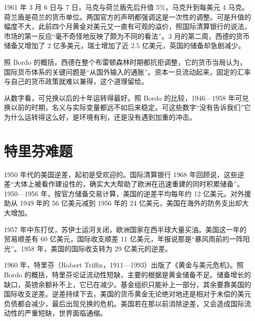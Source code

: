1961 年 3 月 6 日与 7 日，马克与荷兰盾先后升值 5\%，马克升到每美元 4 马克\cite{bis36}。荷兰盾是荷兰的货币单位。两国官方的声明都强调这是一次性的调整。可是升值的幅度不大，此前四个月黄金对美元又一直有可观的溢价，照国际清算银行的说法，市场的第一反应“毫不奇怪地反映了颇为不同的看法”\cite{bis36}。3 月的第二周，西德的货币储备又增加了 2 亿多美元，瑞士增加了近 2.5 亿美元，英国的储备却急剧减少\cite{bis36}。

照 Bordo 的概括，西德在整个布雷顿森林时期都抗拒调整，它的货币当局认为，国际货币体系的关键问题是“从国外输入的通胀”\cite{bordo1993}。资本一旦流动起来，固定的汇率与自己的货币政策就难以兼得，这个道理留给。

从数字看，可兑换以后的十年运转得最好。照 Bordo 的比较，1946—1958 年可兑换以前的时期，名义与实际变量都远不如后来稳定\cite{bordo1993}。可这些数字“没有告诉我们”它为什么运转得这么好，是环境有利，还是没有遇到加重的冲击\cite{bordo1993}。

\section{特里芬难题}\label{sec:brettonwoods-triffin}

1950 年代的美国逆差，起初是受欢迎的。国际清算银行 1968 年回顾说，这些逆差“大体上被看作建设性的，确实大大帮助了欧洲在迅速重建的同时积累储备”\cite{bis36}。1950—1956 年，按官方储备交易计算，美国的逆差平均每年约 12 亿美元\cite{bis36}。对外援助从 1949 年的 56 亿美元减到 1956 年的 24 亿美元，美国在海外的防务支出却大大增加\cite{bis36}。

1957 年中东打仗，苏伊士运河关闭，欧洲国家在西半球大量买油\cite{bis36}。美国这一年的贸易顺差有 60 亿美元，国际收支顺差 11 亿美元，年报说那是“暴风雨前的一阵阳光”\cite{bis36}。1958 年，美国的国际收支转为 29 亿美元的逆差\cite{bis36}。

1960 年，特里芬（Robert Triffin，1911—1993）出版了《黄金与美元危机》\cite{bordo1993,gnd36}。照 Bordo 的概括，特里芬论证流动性短缺，主要的根据是黄金储备不足\cite{bordo1993}。储备增长的缺口，英镑余额补不上，它已在减少。基金组织只能补上一部分，其余要靠美国的国际收支逆差\cite{bordo1993}。逆差持续下去，美国的货币黄金无论绝对地还是相对于未偿的美元负债都会减少，最后出现兑换的危机\cite{bordo1993}。美国若在那以前消除逆差，又会造成国际流动性的严重短缺，世界面临通缩\cite{bordo1993}。

